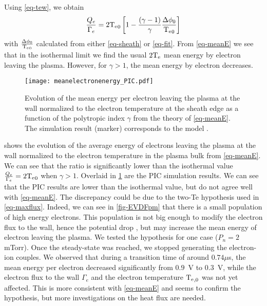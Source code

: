 Using \cref{eq-tew}, we obtain
\begin{equation}
  \label{eq-meanE}
  \frac{Q_e}{\Gamma_e} =  2 \mathrm{T_e}_0 \left[1 - \frac{(\gamma - 1)}{\gamma} \frac{\Delta \phi_0}{\mathrm{T_e}_0} \right]
\end{equation}
with $\frac{\Delta \phi_0}{\mathrm{T_e}_0}$ calculated from either \cref{eq-sheath} or \cref{eq-fit}.
From \cref{eq-meanE} we see that in the isothermal limit we find the usual $2 \mathrm{T_e}$ mean energy by electron leaving the plasma.
However, for $\gamma > 1$, the mean energy by electron decreases.


\begin{figure}[!htbp]
  \centering
  \texttt{[image: meanelectronenergy\_PIC.pdf]}
  \caption{Evolution of the mean energy per electron leaving the plasma at the wall normalized to the electron temperature at the sheath edge as a function of the polytropic index $\gamma$ from the theory of \cref{eq-meanE}. The simulation result (marker) corresponds to the model . }
  \label{fig-avE}
\end{figure}

 shows the evolution of the average energy of electrons leaving the plasma at the wall normalized to the electron temperature in the plasma bulk from \cref{eq-meanE}.
We can see that the ratio is significantly lower than the isothermal value $\frac{Q_e}{\Gamma_e} = 2 \mathrm{T_e}_0$ when $\gamma > 1$.
Overlaid in \cref{fig-avE} are the PIC simulation results.
We can see that the PIC results are lower than the isothermal value, but do not agree well with \cref{eq-meanE}.
The discrepancy could be due to the two-Te hypothesis used in \cref{eq-maxflux}.
Indeed, we can see in \cref{fig-EVDFpm} that there is a small population of high energy electrons.
This population is not big enough to modify the electron flux to the wall, hence the potential drop \citep{demidov2005}, but may increase the mean energy of electron leaving the plasma.
{  We tested the hypothesis for one case ($P_n=2$ mTorr).
Once the steady-state was reached, we stopped generating the electron-ion couples.
We observed that during a transition time of around $0.74 \mu$s, the mean energy per electron decreased significantly from $0.9$~V to $0.3$~V, while the electron flux to the wall $\Gamma_e$ and the electron temperature $\mathrm{T_e}_{, 0}$ was not yet affected.
This is more consistent with \cref{eq-meanE} and seems to confirm the hypothesis, but more investigations on the heat flux are needed.
  }
